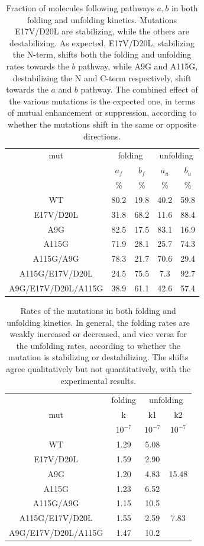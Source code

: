 \begin{table}
\centering
\begin{tabular}{c|cc|cc}
\hline
\hline
mut & \multicolumn{2}{c|}{folding} & \multicolumn{2}{c}{unfolding}\\
& $a_f$ &$b_f$ & $a_u$ & $b_u$\\
&\%&\%&\%&\%\\
\hline
WT 		& 80.2 & 19.8& 40.2 & 59.8\\
E17V/D20L 	& 31.8 & 68.2& 11.6 & 88.4\\
A9G 		& 82.5 & 17.5& 83.1 & 16.9\\
A115G 		& 71.9 & 28.1& 25.7 & 74.3\\
A115G/A9G 	& 78.3 & 21.7& 70.6 & 29.4\\
A115G/E17V/D20L	& 24.5 & 75.5& 7.3  & 92.7\\
A9G/E17V/D20L/A115G& 38.9 &61.1&42.6 & 57.4\\
\hline
\hline
\end{tabular}
\caption{\label{tab:path-flow} Fraction of molecules following pathways $a,b$ in
both folding and unfolding kinetics.  Mutations E17V/D20L are stabilizing, while
the others are destabilizing. As expected, E17V/D20L, stabilizing the N-term,
shifts both the folding and unfolding rates towards the $b$ pathway,  while A9G
and A115G, destabilizing the N and C-term respectively, shift towards the $a$
and $b$ pathway. The combined effect of the various mutations is the expected
one, in terms of mutual enhancement or suppression, according to whether the
mutations shift in the same or opposite directions.}
\end{table}

\begin{table}
\centering
\begin{tabular}{c|c|cc}
\hline
\hline
&\multicolumn{1}{c|}{folding} & \multicolumn{2}{c}{unfolding}\\
mut & k& k1&k2\\
& $10^{-7}$& $10^{-7}$ & $10^{-7}$\\
\hline
WT	  & 1.29 & 5.08&\\
E17V/D20L & 1.59 & 2.90&\\
A9G	  & 1.20 & 4.83& 15.48\\
A115G	  & 1.23 & 6.52&\\
A115G/A9G & 1.15 & 10.5&\\
A115G/E17V/D20L	    & 1.55 & 2.59& 7.83\\
A9G/E17V/D20L/A115G & 1.47 & 10.2&\\
\hline
\hline
\end{tabular}
\caption{\label{tab:path-rate}Rates of the mutations in both folding and
unfolding kinetics. In general, the folding rates are weakly increased or
decreased, and vice versa for the unfolding rates, according to whether the
mutation is stabilizing or destabilizing. The shifts agree qualitatively but not
quantitatively, with the experimental results.}
\end{table}



